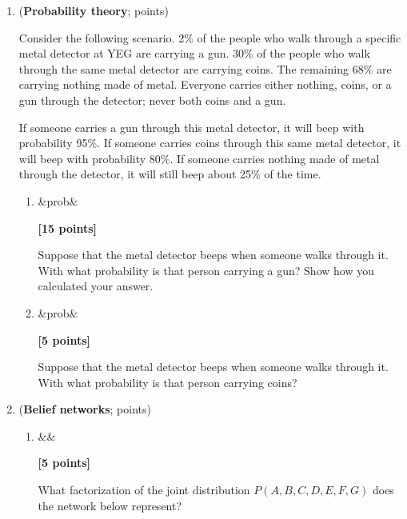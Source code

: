 \documentclass{article}
\newcounter{totalpoints}
\newcommand{\question}[2][]{(\textbf{#2}; \subtotal{#1})}
\newcommand{\subtotal}[1]{\newcounter{#1}\setcounter{#1}{0}\regtotcounter{#1}\total{#1} points}
\newcommand{\points}[2][]{{\addtocounter{totalpoints}{#2}\ifx&#1&\else\addtocounter{#1}{#2}\fi\textbf{[#2 points]}}}
\begin{document}
\clearpage




\begin{enumerate}




\item \question[prob]{Probability theory}

Consider the following scenario.
2\% of the people who walk through a specific metal detector at YEG are carrying a gun.
30\% of the people who walk through the same metal detector are carrying coins.
The remaining 68\% are carrying nothing made of metal.
Everyone carries either nothing, coins, or a gun through the detector; never both coins and a gun.

If someone carries a gun through this metal detector, it will beep with probability 95\%.
If someone carries coins through this same metal detector, it will beep with probability 80\%.
If someone carries nothing made of metal through the detector, it will still beep about 25\% of the time.

\begin{enumerate}
\item \points[prob]{15} \label{q:prob-gun}
Suppose that the metal detector beeps when someone walks through it.
With what probability is that person carrying a gun?  Show how you calculated your answer.

\begin{answer}{1.5in}
\end{answer}

\item \points[prob]{5}
Suppose that the metal detector beeps when someone walks through it.
With what probability is that person carrying coins?

\begin{answer}{1.0in}
\end{answer}


\end{enumerate}

\clearpage



\item \question[bn]{Belief networks}

\begin{enumerate}
\item \points{5}
What factorization of the joint distribution $P(A,B,C,D,E,F,G)$ does the network below represent?


\end{enumerate}
\end{enumerate}
\end{document}
